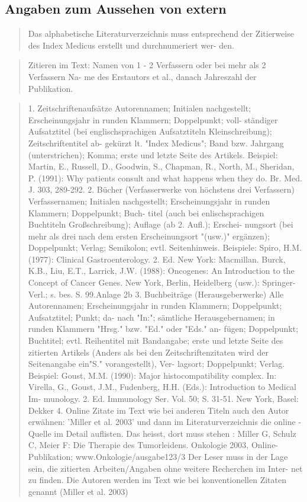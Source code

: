 \documentclass{article}
\begin{document}
\subsection{Angaben zum Aussehen von extern}

\begin{quote}
Das alphabetische Literaturverzeichnis muss entsprechend der
Zitierweise des Index Medicus erstellt und durchnumeriert wer-
den.
\end{quote}

\begin{quote}
Zitieren im Text: Namen von 1 - 2 Verfassern oder bei mehr als 2 Verfassern Na-
me des Erstautors et al., danach Jahreszahl der Publikation.
\end{quote}

\begin{quote}
	1. Zeitschriftenaufsätze
Autorennamen; Initialen nachgestellt; Erscheinungsjahr in runden Klammern; Doppelpunkt; voll-
ständiger Aufsatztitel (bei englischsprachigen Aufsatztiteln Kleinschreibung); Zeitschriftentitel ab-
gekürzt lt. "Index Medicus"; Band bzw. Jahrgang (unterstrichen); Komma; erste und letzte Seite des
Artikels.
Beispiel: Martin, E., Russell, D., Goodwin, S., Chapman, R.,
North, M., Sheridan, P. (1991):
Why patients consult and what happens when they do.
Br. Med. J. 303, 289-292.
2. Bücher (Verfasserwerke von höchstens drei Verfassern)
Verfassernamen; Initialen nachgestellt; Erscheinungsjahr in runden Klammern; Doppelpunkt; Buch-
titel (auch bei enlischsprachigen Buchtiteln Großschreibung); Auflage (ab 2. Aufl.); Erschei-
nungsort (bei mehr als drei nach dem ersten Erscheinungsort "(usw.)" ergänzen); Doppelpunkt;
Verlag; Semikolon; evtl. Seitenhinweis.
Beispiele: Spiro, H.M. (1977):
Clinical Gastroenterology. 2. Ed.
New York: Macmillan.
Burck, K.B., Liu, E.T., Larrick, J.W. (1988):
Oncogenes: An Introduction to the Concept of Cancer
Genes. New York, Berlin, Heidelberg (usw.):
Springer-Verl.; s. bes. S. 99.Anlage 2b
3. Buchbeiträge (Herausgeberwerke)
Alle Autorennamen; Erscheinungsjahr in runden Klammern; Doppelpunkt; Aufsatztitel; Punkt; da-
nach "In:"; sämtliche Herausgebernamen; in runden Klammern "Hrsg." bzw. "Ed." oder "Eds." an-
fügen; Doppelpunkt; Buchtitel; evtl. Reihentitel mit Bandangabe; erste und letzte Seite des zitierten
Artikels (Anders als bei den Zeitschriftenzitaten wird der Seitenangabe ein"S." vorangestellt), Ver-
lagsort; Doppelpunkt; Verlag.
Beispiel: Goust, M.M. (1990): Major histocompatibility complex.
In: Virella, G., Goust, J.M., Fudenberg, H.H. (Eds.): Introduction to Medical Im-
munology.
2. Ed. Immunology Ser. Vol. 50; S. 31-51. New York,
Basel: Dekker
4. Online Zitate
im Text wie bei anderen Titeln auch den Autor erwähnen:
'Miller et al. 2003' und dann im Literaturverzeichnis die online - Quelle
im Detail auflisten. Das heisst, dort muss stehen :
Miller G, Schulz C, Meier F: Die Therapie des Tumorleidens. Onkologie 2003,
Online-Publikation; www.Onkologie/ausgabe123/3
Der Leser muss in der Lage sein, die zitierten Arbeiten/Angaben ohne weitere Recherchen im Inter-
net zu finden. Die Autoren werden im Text wie bei konventionellen Zitaten genannt (Miller et al.
2003)
\end{quote}

\printbibliography
\end{document}
